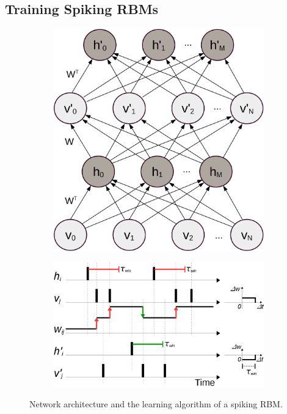 \subsection[Spiking RBMs]{Training Spiking RBMs}
\label{subsec:exp_SRBM}
\begin{figure}[h]
	\centering
		\begin{subfigure}[c]{0.33\textwidth}
			\includegraphics[width=\textwidth]{pics_sdlm/rbm.png}
		\end{subfigure}
		\begin{subfigure}[c]{0.66\textwidth}
			\includegraphics[width=\textwidth]{pics_sdlm/rSTDP_rbm.png}
		\end{subfigure}
	\caption{Network architecture and the learning algorithm of a spiking RBM.}
	\label{fig:sRBM}
\end{figure}


